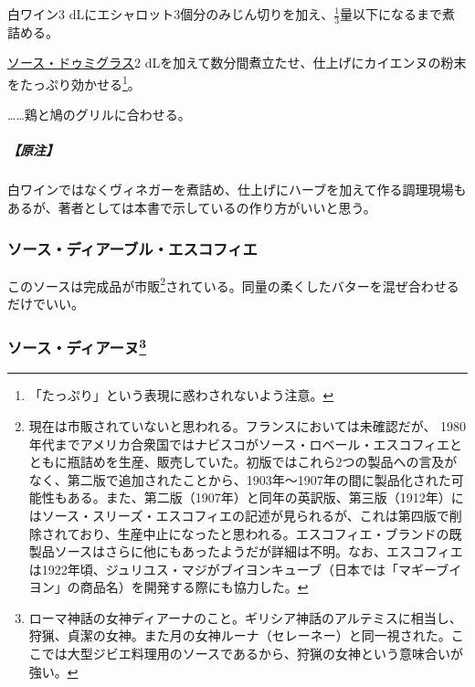 \begin{recette}
白ワイン3
dLにエシャロット3個分のみじん切りを加え、\(\frac{1}{3}\)量以下になるまで煮詰める。

\protect\hyperlink{sauce-demi-glace}{ソース・ドゥミグラス}2
dLを加えて数分間煮立たせ、仕上げにカイエンヌの粉末をたっぷり効かせる\footnote{「たっぷり」という表現に惑わされないよう注意。}。

\ldots{}\ldots{}鶏と鳩のグリルに合わせる。

\hypertarget{nota-sauce-diable}{%
\subparagraph{【原注】}\label{nota-sauce-diable}}

白ワインではなくヴィネガーを煮詰め、仕上げにハーブを加えて作る調理現場もあるが、著者としては本書で示しているの作り方がいいと思う。

\hypertarget{sauce-diable-escoffier}{%
\subsubsection{ソース・ディアーブル・エスコフィエ}\label{sauce-diable-escoffier}}



このソースは完成品が市販\footnote{現在は市販されていないと思われる。フランスにおいては未確認だが、
  1980年代までアメリカ合衆国ではナビスコがソース・ロベール・エスコフィエとともに瓶詰めを生産、販売していた。初版ではこれら2つの製品への言及がなく、第二版で追加されたことから、1903年〜1907年の間に製品化された可能性もある。また、第二版（1907年）と同年の英訳版、第三版（1912年）にはソース・スリーズ・エスコフィエの記述が見られるが、これは第四版で削除されており、生産中止になったと思われる。エスコフィエ・ブランドの既製品ソースはさらに他にもあったようだが詳細は不明。なお、エスコフィエは1922年頃、ジュリユス・マジがブイヨンキューブ（日本では「マギーブイヨン」の商品名）を開発する際にも協力した。}されている。同量の柔くしたバターを混ぜ合わせるだけでいい。

\hypertarget{sauce-diane}{%
\subsubsection[ソース・ディアーヌ]{\texorpdfstring{ソース・ディアーヌ\footnote{ローマ神話の女神ディアーナのこと。ギリシア神話のアルテミスに相当し、狩猟、貞潔の女神。また月の女神ルーナ（セレーネー）と同一視された。ここでは大型ジビエ料理用のソースであるから、狩猟の女神という意味合いが強い。}}{ソース・ディアーヌ}}\label{sauce-diane}}


\end{recette}
